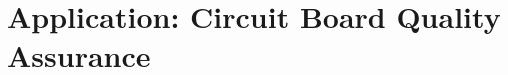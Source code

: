 \documentclass[a4paper,12pt]{article}
\begin{document}


\newpage

\section{Application: Circuit Board Quality Assurance}


\end{document}
